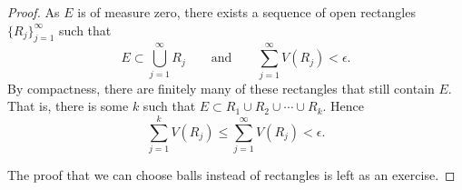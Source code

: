 \begin{proof}
As $E$ is of measure zero,
there exists a sequence of open rectangles $\{ R_j \}_{j=1}^\infty$ such that 
\begin{equation*}
E \subset \bigcup_{j=1}^\infty R_j
\qquad \text{and} \qquad
\sum_{j=1}^\infty V(R_j) < \epsilon.
\end{equation*}
By compactness, there are finitely
many of these rectangles that still contain $E$.  That is, there is some $k$ such
that
$E \subset R_1 \cup R_2 \cup \cdots \cup R_k$.  Hence
\begin{equation*}
\sum_{j=1}^k V(R_j) \leq
\sum_{j=1}^\infty V(R_j) < \epsilon.
\end{equation*}

The proof that we can choose balls instead of rectangles is left as an
exercise.
\end{proof}

